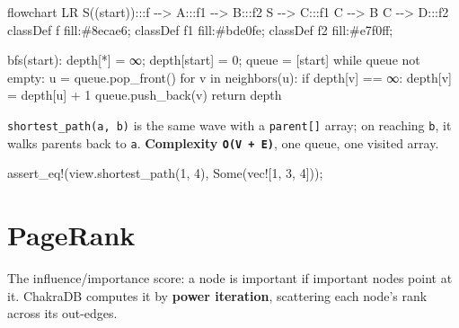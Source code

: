 \documentclass[
  11pt,
  openany]{book}
\newenvironment{Shaded}{}{}
\newcommand{\ConstantTok}[1]{\textcolor[rgb]{0.53,0.00,0.00}{#1}}
\newcommand{\DecValTok}[1]{\textcolor[rgb]{0.25,0.63,0.44}{#1}}
\newcommand{\NormalTok}[1]{#1}
\newcommand{\OperatorTok}[1]{\textcolor[rgb]{0.40,0.40,0.40}{#1}}
\newcommand{\PreprocessorTok}[1]{\textcolor[rgb]{0.74,0.48,0.00}{#1}}
\begin{document}
\begin{Shaded}
\begin{Highlighting}[]
\NormalTok{flowchart LR}
\NormalTok{    S((start)):::f {-}{-}\textgreater{} A:::f1 {-}{-}\textgreater{} B:::f2}
\NormalTok{    S {-}{-}\textgreater{} C:::f1}
\NormalTok{    C {-}{-}\textgreater{} B}
\NormalTok{    C {-}{-}\textgreater{} D:::f2}
\NormalTok{    classDef f fill:\#8ecae6; classDef f1 fill:\#bde0fe; classDef f2 fill:\#e7f0ff;}
\end{Highlighting}
\end{Shaded}

\begin{Shaded}
\begin{Highlighting}[]
\NormalTok{bfs(start):}
\NormalTok{  depth[*] = ∞;  depth[start] = 0;  queue = [start]}
\NormalTok{  while queue not empty:}
\NormalTok{    u = queue.pop\_front()}
\NormalTok{    for v in neighbors(u):}
\NormalTok{      if depth[v] == ∞:}
\NormalTok{        depth[v] = depth[u] + 1}
\NormalTok{        queue.push\_back(v)}
\NormalTok{  return depth}
\end{Highlighting}
\end{Shaded}

\texttt{shortest\_path(a,\ b)} is the same wave with a
\texttt{parent{[}{]}} array; on reaching \texttt{b}, it walks parents
back to \texttt{a}. \textbf{Complexity \texttt{O(V\ +\ E)}}, one queue,
one visited array.

\begin{Shaded}
\begin{Highlighting}[]
\PreprocessorTok{assert\_eq!}\NormalTok{(view}\OperatorTok{.}\NormalTok{shortest\_path(}\DecValTok{1}\OperatorTok{,} \DecValTok{4}\NormalTok{)}\OperatorTok{,} \ConstantTok{Some}\NormalTok{(}\PreprocessorTok{vec!}\NormalTok{[}\DecValTok{1}\OperatorTok{,} \DecValTok{3}\OperatorTok{,} \DecValTok{4}\NormalTok{]))}\OperatorTok{;}
\end{Highlighting}
\end{Shaded}

\section{PageRank}\label{pagerank}

The influence/importance score: a node is important if important nodes
point at it. ChakraDB computes it by \textbf{power iteration},
scattering each node's rank across its out-edges.
\end{document}
